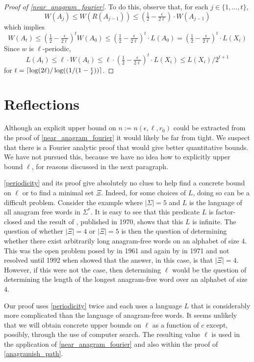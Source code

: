 \documentclass{patmorin}
\begin{document}
\begin{proof}[Proof of \cref{near_anagram_fourier}]
  To do this, observe that, for each $j\in\{1,\ldots,t\}$,
  \begin{equation}
      W(A_j)
        \le W(R(A_{j-1}))
        \le (\tfrac12-\tfrac{\epsilon}{2\ell})\cdot W(A_{j-1})
  \end{equation}
  which implies
  \[
       W(A_t)
       \le (\tfrac12-\tfrac{\epsilon}{2\ell})^t W(A_0) \le (\tfrac12-\tfrac{\epsilon}{2\ell})^t\cdot L(A_0)
       =  (\tfrac12-\tfrac{\epsilon}{2\ell})^t\cdot L(X_i)
  \]
  Since $w$ is $\ell$-periodic,
  \[
        L(A_t)\le \ell\cdot W(A_t) \le \ell\cdot(\tfrac12-\tfrac{\epsilon}{2\ell})^t\cdot L(X_i) \le L(X_i)/2^{t+1}
  \]
  for $t = {\lceil \log(2\ell)/\log((1/(1-\tfrac{\epsilon}{\ell})) \rceil}$.
\end{proof}

\section{Reflections}
\label{reflections}

Although an explicit upper bound on $n:=n(\epsilon,\ell,r_0)$ could be extracted from the proof of \cref{near_anagram_fourier} it would likely be far from tight.  We suspect that there is a Fourier analytic proof that would give better quantitative bounds.  We have not pursued this, because we have no idea how to explicitly upper bound $\ell$, for reasons discussed in the next paragraph.

\cref{periodicity} and its proof give absolutely no clues to help find a concrete bound on $\ell$ or to find a minimal set $\Xi$. Indeed, for some choices of $L$, doing so can be a difficult problem.  Consider the example where $|\Sigma|=5$ and $L$ is the language of all anagram free words in $\Sigma^*$. It is easy to see that this predicate $L$ is factor-closed and the result of \citet{pleasants:non-repetitive}, published in 1970, shows that this $L$ is infinite.  The question of whether $|\Xi|=4$ or $|\Xi|=5$ is then the question of determining whether there exist arbitrarily long anagram-free words on an alphabet of size $4$.  This was the open problem posed by \citet{erdos:some} in 1961 and again by \citet{brown:is} in 1971 and not resolved until 1992 when \citet{keranen:abelian,keranen:powerful} showed that the answer, in this case, is that $|\Xi|=4$.  However, if this were not the case, then determining $\ell$ would be the question of determining the length of the longest anagram-free word over an alphabet of size $4$.

Our proof uses \cref{periodicity} twice and each uses a language $L$ that is considerably more complicated than the language of anagram-free words. It seems unlikely that we will obtain concrete upper bounds on $\ell$ as a function of $c$ except, possibly, through the use of computer search. The resulting value $\ell$ is used in the application of \cref{near_anagram_fourier} and also within the proof of \cref{anagramish_path}.
\end{document}
